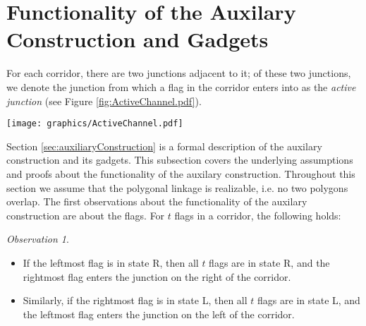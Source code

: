 \documentclass[10pt]{CSUNthesis}
\theoremstyle{plain}%
\theoremstyle{definition}
\theoremstyle{remark}
\newtheorem{observation}{Observation}
\begin{document}
\section{Functionality of the Auxilary Construction and Gadgets}

For each corridor, there are two junctions adjacent to it; of these two junctions, we denote the junction from which a flag in the corridor enters into as the \textit{active junction} (see Figure \ref{fig:ActiveChannel.pdf}).  

\begin{minipage}{\linewidth}
\begin{center}
\texttt{[image: graphics/ActiveChannel.pdf]}
\label{fig:ActiveChannel.pdf}
\end{center}
\end{minipage}


Section \ref{sec:auxiliaryConstruction} is a formal description of the auxilary construction and its gadgets.
This subsection covers the underlying assumptions and proofs about the functionality of the auxilary construction.
Throughout this section we assume that the polygonal linkage is realizable, i.e. no two polygons overlap.  
The first observations about the functionality of the auxilary construction are about the flags.  
For $t$ flags in a corridor, the following holds:
\begin{observation}\label{obs:corridor}
\begin{itemize}
\item[(1)] If the leftmost flag is in state R, then all $t$ flags are in state R, and the rightmost flag enters the junction on the right of the corridor.
\item[(2)] Similarly, if the rightmost flag is in state L, then all $t$ flags are in state L, and the leftmost flag enters the junction on the left of the corridor.
\end{itemize}
\end{observation}
\end{document}
